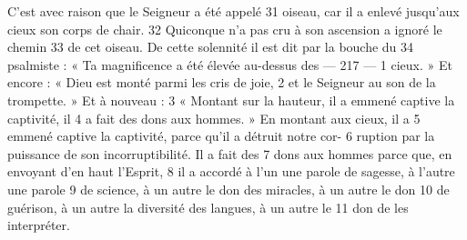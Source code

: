 C'est avec raison que le Seigneur a été appelé	 
31	 	oiseau, car il a enlevé jusqu'aux cieux son corps de chair.	 
32	 	Quiconque n'a pas cru à son ascension a ignoré le chemin	 
33	 	de cet oiseau. De cette solennité il est dit par la bouche du	 
34	 	psalmiste : « Ta magnificence a été élevée au-dessus des	 
 	--- 217 ---	 
1	 	cieux. » Et encore : « Dieu est monté parmi les cris de joie,	 
2	 	et le Seigneur au son de la trompette. » Et à nouveau :	 
3	 	« Montant sur la hauteur, il a emmené captive la captivité, il	 
4	 	a fait des dons aux hommes. » En montant aux cieux, il a	 
5	 	emmené captive la captivité, parce qu'il a détruit notre cor-	 
6	 	ruption par la puissance de son incorruptibilité. Il a fait des	 
7	 	dons aux hommes parce que, en envoyant d'en haut l'Esprit,	 
8	 	il a accordé à l'un une parole de sagesse, à l'autre une parole	 
9	 	de science, à un autre le don des miracles, à un autre le don	 
10	 	de guérison, à un autre la diversité des langues, à un autre le	 
11	 	don de les interpréter.